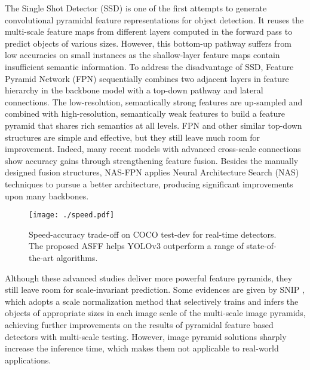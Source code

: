 \documentclass[10pt,twocolumn,letterpaper]{article}
\begin{document}
The Single Shot Detector (SSD) \cite{ssd} is one of the first attempts to generate convolutional pyramidal feature representations for object detection. It reuses the multi-scale feature maps from different layers computed in the forward pass to predict objects of various sizes. However, this bottom-up pathway suffers from low accuracies on small instances as the shallow-layer feature maps contain insufficient semantic information. To address the disadvantage of SSD, Feature Pyramid Network (FPN) \cite{FPN} sequentially combines two adjacent layers in feature hierarchy in the backbone model with a top-down pathway and lateral connections. The low-resolution, semantically strong features are up-sampled and combined with high-resolution, semantically weak features to build a feature pyramid that shares rich semantics at all levels. FPN and other similar top-down structures \cite{dssd,ron,stairnet,refinedet,yolov3} are simple and effective, but they still leave much room for improvement. Indeed, many recent models \cite{panet,weaving,dla,kong-eccv,libra} with advanced cross-scale connections show accuracy gains through strengthening feature fusion. Besides the manually designed fusion structures, NAS-FPN \cite{nas-fpn} applies Neural Architecture Search (NAS) techniques to pursue a better architecture, producing significant improvements upon many backbones. 

\begin{figure}
	\centering
	\texttt{[image: ./speed.pdf]}
	\vspace{0.1cm}
	\caption{Speed-accuracy trade-off on COCO test-dev for real-time detectors. The proposed ASFF helps YOLOv3 outperform a range of state-of-the-art algorithms.}
	\label{fig:speed}
\end{figure}

Although these advanced studies deliver more powerful feature pyramids, they still leave room for scale-invariant prediction. Some evidences are given by SNIP \cite{snip,sniper}, which adopts a scale normalization method that selectively trains and infers the objects of appropriate sizes in each image scale of the multi-scale image pyramids, achieving further improvements on the results of pyramidal feature based detectors with multi-scale testing. However, image pyramid solutions sharply increase the inference time, which makes them not applicable to real-world applications.
\end{document}
